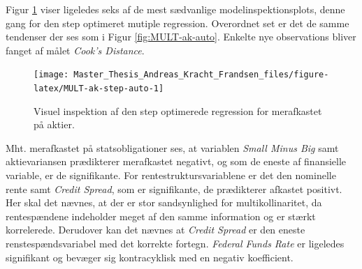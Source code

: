 \documentclass[
  a4paper,
  oneside]{memoir}
\begin{document}
Figur \ref{fig:MULT-ak-step-auto} viser ligeledes seks af de mest sædvanlige modelinspektionsplots, denne gang for den step optimeret mutiple regression. Overordnet set er det de samme tendenser der ses som i Figur \ref{fig:MULT-ak-auto}. Enkelte nye observations bliver fanget af målet \emph{Cook's Distance}.

\begin{figure}[H]

{\centering \texttt{[image: Master\_Thesis\_Andreas\_Kracht\_Frandsen\_files/figure-latex/MULT-ak-step-auto-1]} 

}

\caption{Visuel inspektion af den step optimerede regression for merafkastet på aktier.}\label{fig:MULT-ak-step-auto}
\end{figure}

Mht. merafkastet på statsobligationer ses, at variablen \emph{Small Minus Big} samt aktievariansen prædikterer merafkastet negativt, og som de eneste af finansielle variable, er de signifikante. For rentestruktursvariablene er det den nominelle rente samt \emph{Credit Spread}, som er signifikante, de prædikterer afkastet positivt. Her skal det nævnes, at der er stor sandsynlighed for multikollinaritet, da rentespændene indeholder meget af den samme information og er stærkt korrelerede. Derudover kan det nævnes at \emph{Credit Spread} er den eneste renstespændsvariabel med det korrekte fortegn. \emph{Federal Funds Rate} er ligeledes signifikant og bevæger sig kontracyklisk med en negativ koefficient.
\end{document}
